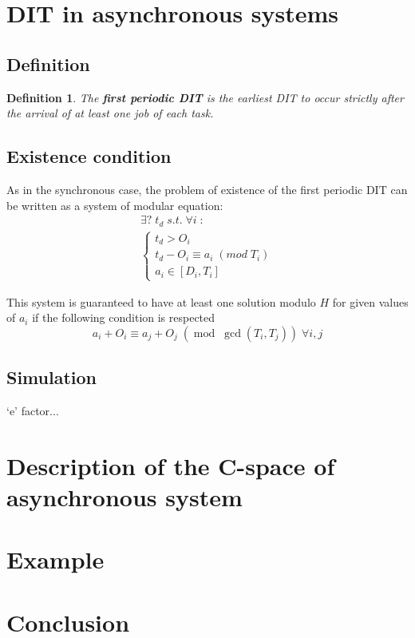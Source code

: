 \documentclass[times, 10pt,twocolumn, a4paper]{article}
\newtheorem{definition}{Definition}
\begin{document}
\section{DIT in asynchronous systems}
  \label{sct:asyncDIT}

  \subsection{Definition}

  \begin{definition}
  The \textbf{first periodic DIT} is the earliest DIT to occur strictly after the arrival of at least one job of each task.
  \end{definition}

  \subsection{Existence condition}

As in the synchronous case, the problem of existence of the first periodic DIT can be written as a system of modular equation:
$$
\begin{array}{l}
  \exists ? \; t_d \; s.t. \; \forall i \; :\\
  \left\{
    \begin{array}{l}
    t_d > O_i \\
    t_d - O_i \equiv a_i \; (mod \; T_i) \\
    a_i \in [D_i, T_i]
  \end{array}
\right.
\end{array}
$$

This system is guaranteed to have at least one solution modulo $H$ for given values of $a_i$ if the following condition is respected $$a_i + O_i \equiv a_j + O_j \; (\operatorname{mod} \; \operatorname{gcd}(T_i, T_j)) \; \forall i, j$$

  \subsection{Simulation}

  `e' factor...

\section{Description of the C-space of asynchronous system}
  \label{sct:asyncCspace}

\section{Example}

\section{Conclusion}



\end{document}
